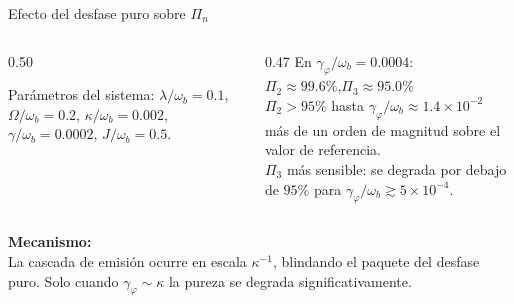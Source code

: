 \documentclass[
11pt,notheorems,hyperref={pdfauthor=whatever}
]{beamer}
\begin{document}
\begin{frame}{Efecto del desfase puro sobre $\Pi_n$}
	
	\begin{columns}[T]
		
		\begin{column}{0.50\textwidth}
			\vspace{-4pt}
			\begin{center}
				\resizebox{\textwidth}{!}{%
				}
			\end{center}
			{\scriptsize
				Parámetros del sistema: $\lambda/\omega_b=0.1$, $\Omega/\omega_b=0.2$,
				$\kappa/\omega_b=0.002$, $\gamma/\omega_b=0.0002$,
				$J/\omega_b=0.5$.
			}
		\end{column}
		
		\begin{column}{0.47\textwidth}
			\vspace{4pt}
			En $\gamma_\varphi/\omega_b = 0.0004$:\\[4pt]
			{\small
				$\Pi_2 \approx 99.6\%$,\quad $\Pi_3 \approx 95.0\%$\\[8pt]
				$\Pi_2 > 95\%$ hasta
				$\gamma_\varphi/\omega_b \approx 1.4\times10^{-2}$
				más de un orden de magnitud sobre el valor
				de referencia.\\[8pt]
				$\Pi_3$ más sensible: se degrada por debajo
				de $95\%$ para $\gamma_\varphi/\omega_b \gtrsim
				5\times10^{-4}$.
			}
		\end{column}
		
	\end{columns}
	
	\vspace{15pt}
	
	\textbf{Mecanismo:}\\[4pt]
	{\small
		La cascada de emisión ocurre en escala $\kappa^{-1}$,
		blindando el paquete del desfase puro. Solo cuando
		$\gamma_\varphi \sim \kappa$ la pureza se degrada
		significativamente.\\[6pt]
	}
	
\end{frame}
\end{document}
